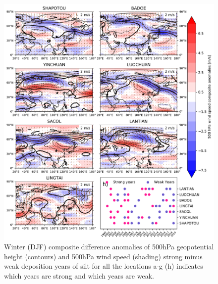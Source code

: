 \begin{figure}[hptb]
    \centering
    \includegraphics[width=\columnwidth]{texfiles/figs/geopot_ws_500hPa_20micron_DJF.pdf}
    \caption{Winter (DJF) composite difference anomalies of 500hPa geopotential height (contours) and 500hPa wind speed (shading) strong minus weak deposition years of silt for all the locations a-g  (h) indicates which years are strong and which years are weak.}
    \label{fig:DJF_500hPa_coarse_composite}
\end{figure}

